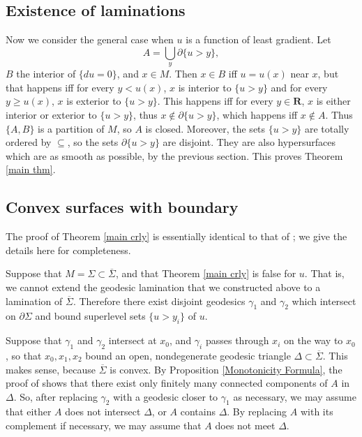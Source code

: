 \documentclass[reqno,12pt,letterpaper]{amsart}
\newcommand{\RR}{\mathbf{R}}
\theoremstyle{definition}
\numberwithin{equation}{section}
\begin{document}
\subsection{Existence of laminations}
Now we consider the general case when $u$ is a function of least gradient.
Let
\begin{equation}\label{lamination union}
A = \bigcup_y \partial \{u > y\},
\end{equation} $B$ the interior of $\{du = 0\}$, and $x \in M$.
Then $x \in B$ iff $u = u(x)$ near $x$, but that happens iff for every $y < u(x)$, $x$ is interior to $\{u > y\}$ and for every $y \geq u(x)$, $x$ is exterior to $\{u > y\}$.
This happens iff for every $y \in \RR$, $x$ is either interior or exterior to $\{u > y\}$, thus $x \notin \partial \{u > y\}$, which happens iff $x \notin A$.
Thus $\{A, B\}$ is a partition of $M$, so $A$ is closed.
Moreover, the sets $\{u > y\}$ are totally ordered by $\subseteq$, so the sets $\partial \{u > y\}$ are disjoint.
They are also hypersurfaces which are as smooth as possible, by the previous section.
This proves Theorem \ref{main thm}.

\subsection{Convex surfaces with boundary}
The proof of Theorem \ref{main crly} is essentially identical to that of \cite[Proposition 3.4]{górny2017planar}; we give the details here for completeness.

Suppose that $M = \Sigma \subset \overline \Sigma$, and that Theorem \ref{main crly} is false for $u$.
That is, we cannot extend the geodesic lamination that we constructed above to a lamination of $\overline \Sigma$.
Therefore there exist disjoint geodesics $\gamma_1$ and $\gamma_2$ which intersect on $\partial \Sigma$ and bound superlevel sets $\{u > y_i\}$ of $u$.

Suppose that $\gamma_1$ and $\gamma_2$ intersect at $x_0$, and $\gamma_i$ passes through $x_i$ on the way to $x_0$, so that $x_0, x_1, x_2$ bound an open, nondegenerate geodesic triangle $\Delta \subset \overline \Sigma$. This makes sense, because $\overline \Sigma$ is convex.
By Proposition \ref{Monotonicity Formula}, the proof of \cite[Remark 37.9]{simon1983GMT} shows that there exist only finitely many connected components of $A$ in $\Delta$.
So, after replacing $\gamma_2$ with a geodesic closer to $\gamma_1$ as necessary, we may assume that either $A$ does not intersect $\Delta$, or $A$ contains $\Delta$.
By replacing $A$ with its complement if necessary, we may assume that $A$ does not meet $\Delta$.
\end{document}

